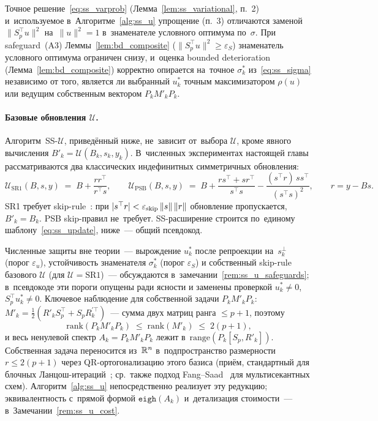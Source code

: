 \begin{remark}
\label{rem:ss_variational_alg}
Точное решение~\eqref{eq:ss_varprob} (Лемма~\ref{lem:ss_variational}, п.~2)
и~используемое в~Алгоритме~\ref{alg:ss_u} упрощение (п.~3)
отличаются заменой $\|S_p^\top u\|^2$ на~$\|u\|^2 = 1$ в~знаменателе
условного оптимума по~$\sigma$. При safeguard~(A3) Леммы~\ref{lem:bd_composite}
($\|S_p^\top u\|^2 \ge \varepsilon_S$) знаменатель условного оптимума ограничен
снизу, и~оценка bounded deterioration (Лемма~\ref{lem:bd_composite})
корректно опирается на~точное $\sigma_k^*$ из~\eqref{eq:ss_sigma}
независимо от того, является ли выбранный $u_k^*$ точным максимизатором
$\rho(u)$ или ведущим собственным вектором $P_k M'_k P_k$.
\end{remark}

\paragraph{Базовые обновления $\mathcal{U}$.}
Алгоритм~SS-$\mathcal{U}$, приведённый ниже, не~зависит от~выбора
$\mathcal{U}$, кроме явного вычисления $B'_k=\mathcal{U}(B_k,s_k,y_k)$.
В~численных экспериментах настоящей главы рассматриваются
два классических индефинитных симметричных обновления:
\[
  \mathcal{U}_{\mathrm{SR1}}(B,s,y)
   \;=\; B + \frac{r r^\top}{r^\top s},
  \qquad
  \mathcal{U}_{\mathrm{PSB}}(B,s,y)
   \;=\; B + \frac{r s^\top + s r^\top}{s^\top s}
        - \frac{(s^\top r)\, s s^\top}{(s^\top s)^2},
  \qquad r = y - Bs.
\]
SR1 требует skip-rule~\cite[\S 6.2]{bfgs}: при
$|s^\top r|<\varepsilon_{\mathrm{skip}}\left\|s\right\|\left\|r\right\|$
обновление пропускается, $B'_k = B_k$. PSB skip-правил не~требует.
SS-расширение строится по~единому шаблону~\eqref{eq:ss_update},
ниже~--- общий псевдокод.

\medskip
Численные защиты вне теории~--- вырождение $u_k^*$ после репроекции
на~$s_k^\perp$ (порог $\varepsilon_u$), устойчивость знаменателя
$\sigma_k^*$ (порог $\varepsilon_S$) и собственный skip-rule базового
$\mathcal{U}$ (для $\mathcal{U}=\mathrm{SR1}$)~--- обсуждаются
в~замечании~\ref{rem:ss_u_safeguards}; в~псевдокоде эти пороги опущены
ради ясности и заменены проверкой $u_k^*\ne 0$, $S_p^\top u_k^*\ne 0$.
Ключевое наблюдение для собственной задачи $P_k M'_k P_k$:
$M'_k=\tfrac12(R'_k S_p^\top+S_p R_k^{\prime\top})$~--- сумма двух
матриц ранга $\le p+1$, поэтому
\begin{equation}\label{eq:ss_low_rank}
  \mathrm{rank}(P_k M'_k P_k)
   \;\le\; \mathrm{rank}(M'_k)
   \;\le\; 2(p+1),
\end{equation}
и весь ненулевой спектр $A_k=P_k M'_k P_k$ лежит
в~$\mathrm{range}(P_k[S_p,R'_k])$. Собственная задача переносится
из~$\mathbb{R}^n$ в~подпространство размерности $r\le 2(p+1)$ через
QR-ортогонализацию этого базиса (приём, стандартный для блочных
Ланцош-итераций~\cite[Гл.~13]{parlett1998}; ср.\ также подход
Fang--Saad~\cite{fang2009} для мультисекантных схем).
Алгоритм~\ref{alg:ss_u} непосредственно реализует эту редукцию;
эквивалентность с~прямой формой $\mathtt{eigh}(A_k)$ и~детализация
стоимости~--- в~Замечании~\ref{rem:ss_u_cost}.

